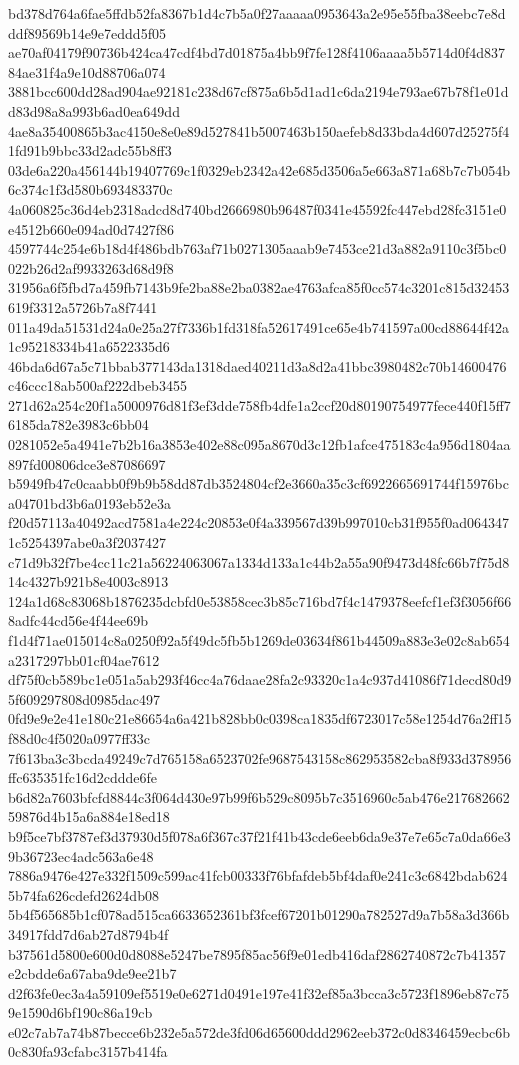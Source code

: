 {bd378d764a6fae5ffdb52fa8367b1d4c7b5a0f27aaaaa0953643a2e95e55fba38eebc7e8dddf89569b14e9e7eddd5f05
ae70af04179f90736b424ca47cdf4bd7d01875a4bb9f7fe128f4106aaaa5b5714d0f4d83784ae31f4a9e10d88706a074
3881bcc600dd28ad904ae92181c238d67cf875a6b5d1ad1c6da2194e793ae67b78f1e01dd83d98a8a993b6ad0ea649dd
4ae8a35400865b3ac4150e8e0e89d527841b5007463b150aefeb8d33bda4d607d25275f41fd91b9bbc33d2adc55b8ff3
03de6a220a456144b19407769c1f0329eb2342a42e685d3506a5e663a871a68b7c7b054b6c374c1f3d580b693483370c
4a060825c36d4eb2318adcd8d740bd2666980b96487f0341e45592fc447ebd28fc3151e0e4512b660e094ad0d7427f86
4597744c254e6b18d4f486bdb763af71b0271305aaab9e7453ce21d3a882a9110c3f5bc0022b26d2af9933263d68d9f8
31956a6f5fbd7a459fb7143b9fe2ba88e2ba0382ae4763afca85f0cc574c3201c815d32453619f3312a5726b7a8f7441
011a49da51531d24a0e25a27f7336b1fd318fa52617491ce65e4b741597a00cd88644f42a1c95218334b41a6522335d6
46bda6d67a5c71bbab377143da1318daed40211d3a8d2a41bbc3980482c70b14600476c46ccc18ab500af222dbeb3455
271d62a254c20f1a5000976d81f3ef3dde758fb4dfe1a2ccf20d80190754977fece440f15ff76185da782e3983c6bb04
0281052e5a4941e7b2b16a3853e402e88c095a8670d3c12fb1afce475183c4a956d1804aa897fd00806dce3e87086697
b5949fb47c0caabb0f9b9b58dd87db3524804cf2e3660a35c3cf6922665691744f15976bca04701bd3b6a0193eb52e3a
f20d57113a40492acd7581a4e224c20853e0f4a339567d39b997010cb31f955f0ad0643471c5254397abe0a3f2037427
c71d9b32f7be4cc11c21a56224063067a1334d133a1c44b2a55a90f9473d48fc66b7f75d814c4327b921b8e4003c8913
124a1d68c83068b1876235dcbfd0e53858cec3b85c716bd7f4c1479378eefcf1ef3f3056f668adfc44cd56e4f44ee69b
f1d4f71ae015014c8a0250f92a5f49dc5fb5b1269de03634f861b44509a883e3e02c8ab654a2317297bb01cf04ae7612
df75f0cb589bc1e051a5ab293f46cc4a76daae28fa2c93320c1a4c937d41086f71decd80d95f609297808d0985dac497
0fd9e9e2e41e180c21e86654a6a421b828bb0c0398ca1835df6723017c58e1254d76a2ff15f88d0c4f5020a0977ff33c
7f613ba3c3bcda49249c7d765158a6523702fe9687543158c862953582cba8f933d378956ffc635351fc16d2cddde6fe
b6d82a7603bfcfd8844c3f064d430e97b99f6b529c8095b7c3516960c5ab476e21768266259876d4b15a6a884e18ed18
b9f5ce7bf3787ef3d37930d5f078a6f367c37f21f41b43cde6eeb6da9e37e7e65c7a0da66e39b36723ec4adc563a6e48
7886a9476e427e332f1509c599ac41fcb00333f76bfafdeb5bf4daf0e241c3c6842bdab6245b74fa626cdefd2624db08
5b4f565685b1cf078ad515ca6633652361bf3fcef67201b01290a782527d9a7b58a3d366b34917fdd7d6ab27d8794b4f
b37561d5800e600d0d8088e5247be7895f85ac56f9e01edb416daf2862740872c7b41357e2cbdde6a67aba9de9ee21b7
d2f63fe0ec3a4a59109ef5519e0e6271d0491e197e41f32ef85a3bcca3c5723f1896eb87c759e1590d6bf190c86a19cb
e02c7ab7a74b87becce6b232e5a572de3fd06d65600ddd2962eeb372c0d8346459ecbc6b0c830fa93cfabc3157b414fa
}
